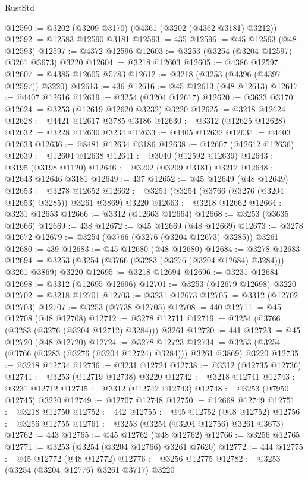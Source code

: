 \begin{lexlean}{RustStd}
\begin{coremodule}
@12590 := @3202 (@3209 @3170) (@4361 (@3202 (@4362 @3181) @3212))
@12592 := @12583 @12590 @3181
@12593 := 435
@12596 := @45 @12593 (@48 @12593)
@12597 := @4372 @12596
@12603 := @3253 (@3254 (@3204 @12597) @3261 @3673) @3220
@12604 := @3218 @12603
@12605 := @4386 @12597
@12607 := @4385 @12605 @5783
@12612 := @3218 (@3253 (@4396 (@4397 @12597)) @3220)
@12613 := 436
@12616 := @45 @12613 (@48 @12613)
@12617 := @4407 @12616
@12619 := @3254 (@3204 @12617)
@12620 := @3633 @3170
@12624 := @3253 (@12619 @12620 @3232) @3220
@12625 := @3218 @12624
@12628 := @4421 @12617 @3785 @3186
@12630 := @3312 (@12625 @12628)
@12632 := @3228 @12630 @3234
@12633 := @4405 @12632
@12634 := @4403 @12633
@12636 := @8481 @12634 @3186
@12638 := @12607 (@12612 @12636)
@12639 := @12604 @12638
@12641 := @3040 (@12592 @12639)
@12643 := @3195 (@3198 @1120)
@12646 := @3202 (@3209 @3181) @3212
@12648 := @12643 @12646 @3181
@12649 := 437
@12652 := @45 @12649 (@48 @12649)
@12653 := @3278 @12652
@12662 := @3253 (@3254 (@3766 (@3276 (@3204 @12653) @3285)) @3261 @3869) @3220
@12663 := @3218 @12662
@12664 := @3231 @12653
@12666 := @3312 (@12663 @12664)
@12668 := @3253 (@3635 @12666)
@12669 := 438
@12672 := @45 @12669 (@48 @12669)
@12673 := @3278 @12672
@12679 := @3254 (@3766 (@3276 (@3204 @12673) @3285)) @3261
@12680 := 439
@12683 := @45 @12680 (@48 @12680)
@12684 := @3278 @12683
@12694 := @3253 (@3254 (@3766 (@3283 (@3276 (@3204 @12684) @3284))) @3261 @3869) @3220
@12695 := @3218 @12694
@12696 := @3231 @12684
@12698 := @3312 (@12695 @12696)
@12701 := @3253 (@12679 @12698) @3220
@12702 := @3218 @12701
@12703 := @3231 @12673
@12705 := @3312 (@12702 @12703)
@12707 := @3253 (@7738 @12705)
@12708 := 440
@12711 := @45 @12708 (@48 @12708)
@12712 := @3278 @12711
@12719 := @3254 (@3766 (@3283 (@3276 (@3204 @12712) @3284))) @3261
@12720 := 441
@12723 := @45 @12720 (@48 @12720)
@12724 := @3278 @12723
@12734 := @3253 (@3254 (@3766 (@3283 (@3276 (@3204 @12724) @3284))) @3261 @3869) @3220
@12735 := @3218 @12734
@12736 := @3231 @12724
@12738 := @3312 (@12735 @12736)
@12741 := @3253 (@12719 @12738) @3220
@12742 := @3218 @12741
@12743 := @3231 @12712
@12745 := @3312 (@12742 @12743)
@12748 := @3253 (@7950 @12745) @3220
@12749 := @12707 @12748
@12750 := @12668 @12749
@12751 := @3218 @12750
@12752 := 442
@12755 := @45 @12752 (@48 @12752)
@12756 := @3256 @12755
@12761 := @3253 (@3254 (@3204 @12756) @3261 @3673)
@12762 := 443
@12765 := @45 @12762 (@48 @12762)
@12766 := @3256 @12765
@12771 := @3253 (@3254 (@3204 @12766) @3261 @7620)
@12772 := 444
@12775 := @45 @12772 (@48 @12772)
@12776 := @3256 @12775
@12782 := @3253 (@3254 (@3204 @12776) @3261 @3717) @3220

\end{coremodule}
\end{lexlean}
